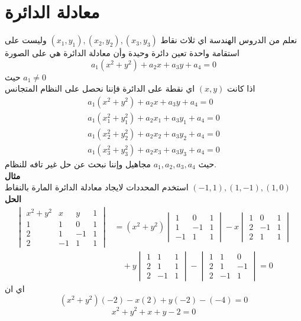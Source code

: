 \section*{معادلة الدائرة}
نعلم من الدروس الهندسة اي ثلاث نقاط
$(x_1, y_1), (x_2, y_2), (x_3, y_3)$
وليست على استقامة واحدة تعين دائرة وحيدة وأن معادلة الدائرة هي على الصورة
\[
a_1(x^2 + y^2) + a_2 x + a_3 y + a_4 =0 
\]
حيث $a_1\neq0$\\
اذا كانت $(x,y)$ اي نقطة على الدائرة فإننا نحصل على النظام المتجانس
\begin{align*}
	a_1(x^2 + y^2) + a_2 x + a_3 y + a_4 =0 \\
	a_1(x_1^2 + y_1^2) + a_2 x_1 + a_3 y_1 + a_4 =0 \\
	a_1(x_2^2 + y_2^2) + a_2 x_2 + a_3 y_2 + a_4 =0\\ 
	a_1(x_3^2 + y_3^2) + a_2 x_3 + a_3 y_3 + a_4 =0 
\end{align*}
حيث $a_1,a_2,a_3,a_4$ مجاهيل وإننا نبحث عن حل غير تافه للنظام.\\
\noindent
\textbf{مثال}\\
\noindent
استخدم المحددات لايجاد معادلة الدائرة المارة بالنقاط
$(-1, 1), (1,-1), (1,0)$\\
\noindent
\textbf{الحل}
\begin{align*}
	\begin{vmatrix}
		x^2+y^2 & x & y & 1\\
		1 & 1 & 0 & 1\\
		2 & 1 & -1 & 1 \\
		2 & -1 & 1 & 1
	\end{vmatrix} & = (x^2 +y^2)
	\begin{vmatrix}
		1&0&1\\
		1&-1&1\\
		-1&1&1
	\end{vmatrix}
	-x
	\begin{vmatrix}
		1&0&1\\
		2&-1&1\\
		2&1&1
	\end{vmatrix}\\
	& \quad +y
	\begin{vmatrix}
		1&1&1\\
		2&1&1\\
		2&-1&1
	\end{vmatrix}
	-
	\begin{vmatrix}
		1&1&0\\
		2&1&-1\\
		2&-1&1
	\end{vmatrix} =0
\end{align*}
اي ان 
\[
(x^2 + y^2)(-2) -x(2) + y(-2) - (-4) =0 
\]
\[
x^2 + y^2 + x + y-2=0
\]

